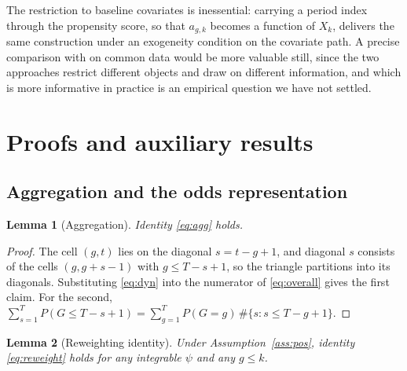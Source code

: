 \documentclass[12pt]{article}
\newtheorem{lemma}{Lemma}
\theoremstyle{remark}
\begin{document}
The restriction to baseline covariates is inessential: carrying a period index through the
propensity score, so that $a_{g,k}$ becomes a function of $X_k$, delivers the same
construction under an exogeneity condition on the covariate path. A precise comparison
with \citet{rambachan2023honest} on common data would be more valuable still, since the
two approaches restrict different objects and draw on different information, and which is
more informative in practice is an empirical question we have not settled.

\appendix
\section{Proofs and auxiliary results}
\label{app:proofs}

\setcounter{lemma}{0}
\renewcommand{\thelemma}{A\arabic{lemma}}
\setcounter{proposition}{0}
\renewcommand{\theproposition}{A\arabic{proposition}}
\setcounter{corollary}{0}
\renewcommand{\thecorollary}{A\arabic{corollary}}
\setcounter{remark}{0}
\renewcommand{\theremark}{A\arabic{remark}}
\renewcommand{\theHlemma}{A\arabic{lemma}}
\renewcommand{\theHproposition}{A\arabic{proposition}}
\renewcommand{\theHcorollary}{A\arabic{corollary}}
\renewcommand{\theHremark}{A\arabic{remark}}

\subsection{Aggregation and the odds representation}

\begin{lemma}[Aggregation]
\label{lem:agg}
Identity \eqref{eq:agg} holds.
\end{lemma}

\begin{proof}
The cell $(g,t)$ lies on the diagonal $s = t-g+1$, and diagonal $s$ consists of the cells
$(g, g+s-1)$ with $g \le T-s+1$, so the triangle partitions into its diagonals.
Substituting \eqref{eq:dyn} into the numerator of \eqref{eq:overall} gives the first
claim. For the second,
$\sum_{s=1}^{T} P(G \le T{-}s{+}1) = \sum_{g=1}^{T} P(G{=}g)\,\#\{s : s \le T{-}g{+}1\}$.
\end{proof}

\begin{lemma}[Reweighting identity]
\label{lem:reweight}
Under Assumption~\ref{ass:pos}, identity \eqref{eq:reweight} holds for any integrable
$\psi$ and any $g \le k$.
\end{lemma}
\end{document}
